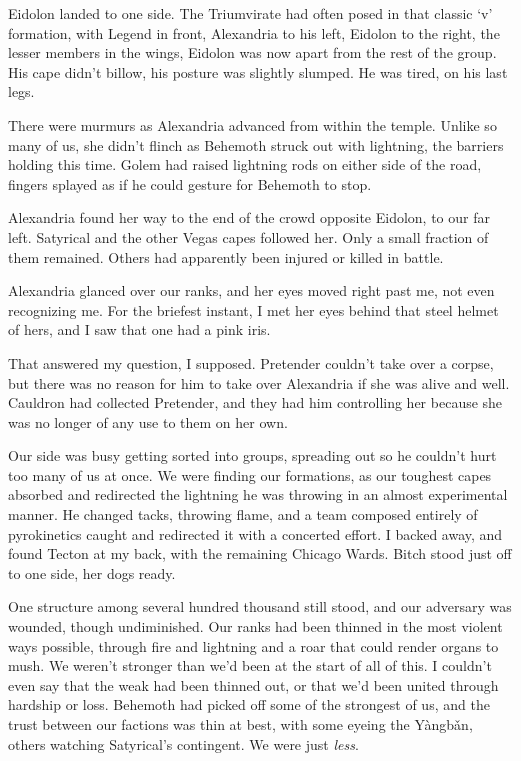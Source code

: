 Eidolon landed to one side.  The Triumvirate had often posed in that classic `v' formation, with Legend in front, Alexandria to his left, Eidolon to the right, the lesser members in the wings, Eidolon was now apart from the rest of the group.  His cape didn't billow, his posture was slightly slumped.  He was tired, on his last legs.



There were murmurs as Alexandria advanced from within the temple.  Unlike so many of us, she didn't flinch as Behemoth struck out with lightning, the barriers holding this time.  Golem had raised lightning rods on either side of the road, fingers splayed as if he could gesture for Behemoth to stop.



Alexandria found her way to the end of the crowd opposite Eidolon, to our far left.  Satyrical and the other Vegas capes followed her.  Only a small fraction of them remained.  Others had apparently been injured or killed in battle.



Alexandria glanced over our ranks, and her eyes moved right past me, not even recognizing me.  For the briefest instant, I met her eyes behind that steel helmet of hers, and I saw that one had a pink iris.



That answered my question, I supposed.  Pretender couldn't take over a corpse, but there was no reason for him to take over Alexandria if she was alive and well.  Cauldron had collected Pretender, and they had him controlling her because she was no longer of any use to them on her own.



Our side was busy getting sorted into groups, spreading out so he couldn't hurt too many of us at once.  We were finding our formations, as our toughest capes absorbed and redirected the lightning he was throwing in an almost experimental manner.  He changed tacks, throwing flame, and a team composed entirely of pyrokinetics caught and redirected it with a concerted effort.  I backed away, and found Tecton at my back, with the remaining Chicago Wards.  Bitch stood just off to one side, her dogs ready.



One structure among several hundred thousand still stood, and our adversary was wounded, though undiminished.  Our ranks had been thinned in the most violent ways possible, through fire and lightning and a roar that could render organs to mush.  We weren't stronger than we'd been at the start of all of this.  I couldn't even say that the weak had been thinned out, or that we'd been united through hardship or loss.  Behemoth had picked off some of the strongest of us, and the trust between our factions was thin at best, with some eyeing the Y\`{a}ngb\v{a}n, others watching Satyrical's contingent.  We were just \emph{less}.



